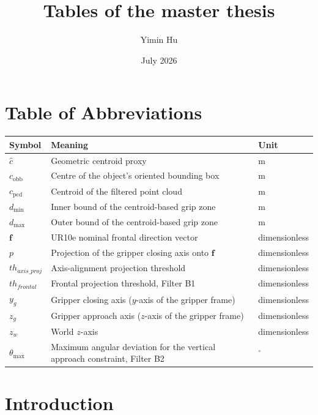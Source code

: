\documentclass[12pt,a4paper]{report}
\title{Tables of the master thesis}
\author{Yimin Hu}
\date{July 2026}
\begin{document}
\maketitle
\chapter*{Table of Abbreviations}

\begin{longtable}{@{}p{}p{}p{}@{}}
\toprule
\textbf{Symbol} & \textbf{Meaning} & \textbf{Unit} \\
\midrule
\endhead
$\hat{c}$ & Geometric centroid proxy & m \\
$c_{\mathrm{obb}}$ & Centre of the object's oriented bounding box & m \\
$c_{\mathrm{pcd}}$ & Centroid of the filtered point cloud & m \\
$d_{\min}$ & Inner bound of the centroid-based grip zone & m \\
$d_{\max}$ & Outer bound of the centroid-based grip zone & m \\
$\mathbf{f}$ & UR10e nominal frontal direction vector & dimensionless \\
$p$ & Projection of the gripper closing axis onto $\mathbf{f}$ & dimensionless \\
$th_{axis\_proj}$ & Axis-alignment projection threshold & dimensionless \\
$th_{frontal}$ & Frontal projection threshold, Filter B1 & dimensionless \\
$y_g$ & Gripper closing axis ($y$-axis of the gripper frame) & dimensionless \\
$z_g$ & Gripper approach axis ($z$-axis of the gripper frame) & dimensionless \\
$z_w$ & World $z$-axis & dimensionless \\
$\theta_{\max}$ & Maximum angular deviation for the vertical approach constraint, Filter B2 & $^{\circ}$ \\
\bottomrule
\end{longtable}

\newpage
\chapter{Introduction}
\end{document}
